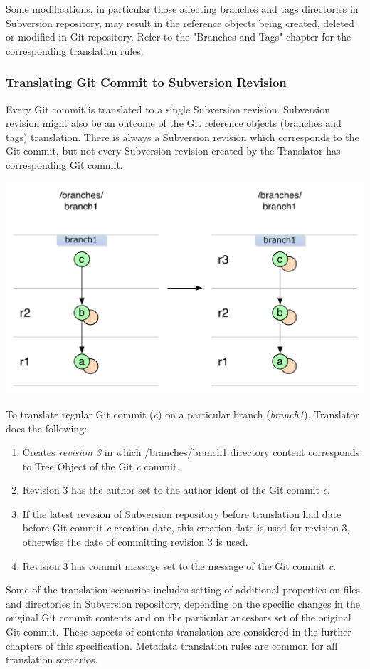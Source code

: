 Some modifications, in particular those affecting branches and tags directories in Subversion repository, may
result in the reference objects being created, deleted or modified in Git repository. Refer to the "Branches and Tags" 
chapter for the corresponding translation rules.

\subsubsection{Translating Git Commit to Subversion Revision}
Every Git commit is translated to a single Subversion revision. Subversion revision might also be an outcome of 
the Git reference objects (branches and tags) translation. There is always a Subversion revision
which corresponds to the Git commit, but not every Subversion revision created by the Translator has 
corresponding Git commit.
\begin{center}
\includegraphics[width=\textwidth]{img/diagrams/single_change_git_to_svn.pdf}%
\label{single_change_git_to_svn}%
\end{center}

To translate regular Git commit (\emph{c}) on a particular branch (\emph{branch1}), Translator does 
the following:
\begin{enumerate}
	\compactlist
	\item Creates \emph{revision 3} in which /branches/branch1 directory content corresponds to Tree Object of the Git \emph{c} commit.
	\item Revision 3 has the author set to the author ident of the Git commit \emph{c}.
	\item If the latest revision of Subversion repository before translation had date before Git commit \emph{c} creation date, this creation date is used for revision 3, otherwise the date of committing revision 3 is used.
	\item Revision 3 has commit message set to the message of the Git commit \emph{c}.
\end{enumerate}

Some of the translation scenarios includes setting of additional properties on files and directories 
in Subversion repository, depending on the specific changes in the original Git commit contents and 
on the particular ancestors set of the original Git commit. These aspects of contents translation are considered in the further chapters of
this specification. Metadata translation rules are common for all translation scenarios.